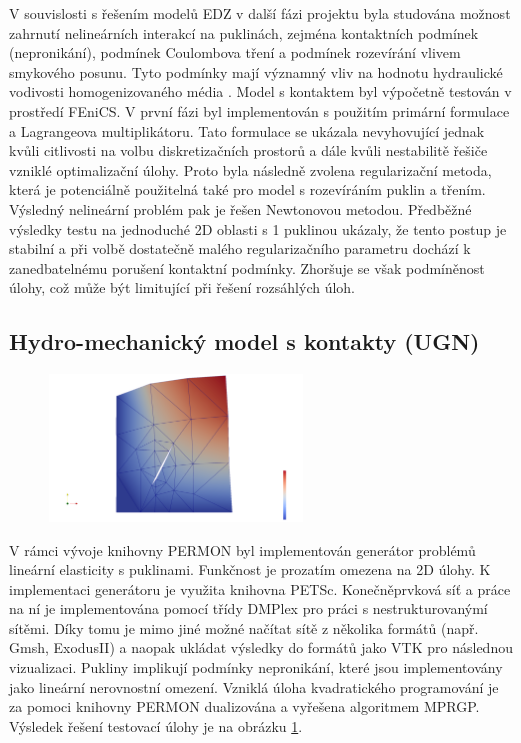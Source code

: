 \documentclass[11pt,a4paper]{article}
\newcommand{\sy}[1]{{\color{blue} SS: #1}}
\begin{document}
\begin{onehalfspacing}
V souvislosti s řešením modelů EDZ v další fázi projektu byla studována možnost zahrnutí nelineárních 
interakcí na puklinách, zejména kontaktních podmínek (nepronikání), podmínek Coulombova tření a podmínek rozevírání vlivem smykového posunu.
Tyto podmínky mají významný vliv na hodnotu hydraulické vodivosti homogenizovaného média \cite{min_2004}.
Model s kontaktem byl výpočetně testován v prostředí FEniCS. V první fázi byl implementován s použitím primární formulace 
a Lagrangeova multiplikátoru. Tato formulace se ukázala nevyhovující jednak kvůli citlivosti na volbu diskretizačních 
prostorů a dále kvůli nestabilitě řešiče vzniklé optimalizační úlohy. Proto byla následně zvolena regularizační metoda, 
která je potenciálně použitelná také pro model s rozevíráním puklin a třením. Výsledný nelineární problém pak je řešen 
Newtonovou metodou. Předběžné výsledky testu na jednoduché 2D oblasti s 1 puklinou ukázaly, že tento postup je stabilní 
a při volbě dostatečně malého regularizačního parametru dochází k zanedbatelnému porušení kontaktní podmínky. Zhoršuje 
se však podmíněnost úlohy, což může být limitující při řešení rozsáhlých úloh.




\subsection{Hydro-mechanický model s kontakty (UGN)}
\begin{figure}
    \centering
    \includegraphics[width=0.6\textwidth]{graphics/ugn_permon_pull.png}
    \caption{}
    \label{fig:ugn_pull}
\end{figure}

V rámci vývoje knihovny PERMON byl implementován generátor problémů lineární
elasticity s puklinami. Funkčnost je prozatím omezena na 2D úlohy. K
implementaci generátoru je využita knihovna PETSc. Konečněprvková síť a
práce na ní je implementována pomocí třídy DMPlex pro práci s
nestrukturovanýmí sítěmi. Díky tomu je mimo jiné možné načítat sítě z
několika formátů (např. Gmsh, ExodusII) a naopak ukládat výsledky do
formátů jako VTK pro následnou vizualizaci. Pukliny implikují podmínky
nepronikání, které jsou implementovány jako lineární nerovnostní
omezení. Vzniklá úloha kvadratického programování je za pomoci knihovny
PERMON dualizována a vyřešena algoritmem MPRGP. 
Výsledek řešení testovací úlohy je na obrázku \ref{fig:ugn_pull}.


\end{onehalfspacing}
\end{document}
